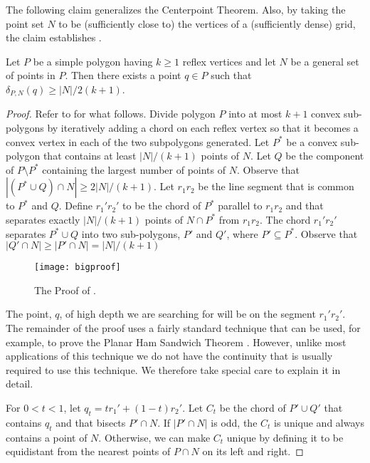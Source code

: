 \documentclass{article}
\begin{document}
The following claim generalizes the Centerpoint Theorem.  Also, by
taking the point set $N$ to be (sufficiently close to) the vertices of
a (sufficiently dense) grid, the claim establishes
. 

\begin{clm} 
Let $P$ be a simple polygon having $k\ge 1$ reflex vertices and let
$N$ be a general set of points in $P$.  Then there exists a point
$q\in P$ such that $\delta_{P,N}(q) \ge |N|/2(k+1)$.
\end{clm}
\begin{proof}
Refer to  for what follows.  
Divide polygon $P$ into at most $k+1$ convex sub-polygons by
iteratively adding a chord on each reflex vertex so that it becomes a
convex vertex in each of the two subpolygons generated.  Let $P^*$ be
a convex sub-polygon that contains at least $|N|/(k+1)$ points of $N$.
Let $Q$ be the component of $P\setminus P^*$ containing the largest
number of points of $N$.  Observe that $|(P^*\cup Q)\cap N|\ge
2|N|/(k+1)$.  Let $r_1r_2$ be the line segment that is common to
$P^*$ and $Q$.  Define $r_1'r_2'$ to be the chord of $P^*$ parallel to
$r_1r_2$ and that separates exactly $|N|/(k+1)$ points of
$N\cap P^*$ from $r_1r_2$.  The chord $r_1'r_2'$ separates $P^*\cup Q$
into two sub-polygons, $P'$ and $Q'$, where $P'\subseteq P^*$.
Observe that $|Q'\cap N|\ge |P'\cap N| = |N|/(k+1)$

\begin{figure}
  \begin{center}
    \texttt{[image: bigproof]}
  \end{center}
  \caption{The Proof of .}
\end{figure}

The point, $q$, of high depth we are searching for will be on the
segment $r_1'r_2'$. The remainder of the proof uses a fairly standard
technique that can be used, for example, to prove the Planar Ham
Sandwich Theorem \cite{m03}. However, unlike most applications of this
technique we do not have the continuity that is usually required to
use this technique.  We therefore take special care to explain it in
detail.
 
For $0< t< 1$, let $q_t = tr_1'+(1-t)r_2'$.  Let $C_t$ be the chord of
$P'\cup Q'$ that contains $q_t$ and that bisects $P'\cap N$.  If
$|P'\cap N|$ is odd, the $C_t$ is unique and always contains a point
of $N$.  Otherwise, we can make $C_t$ unique by defining it to be
equidistant from the nearest points of $P\cap N$ on its left and
right.


\end{proof}
\end{document}

